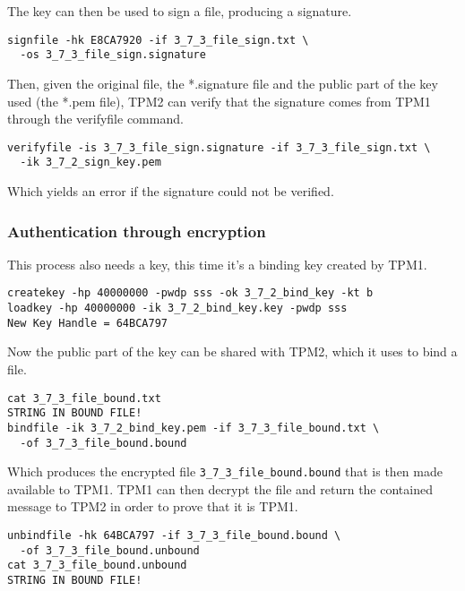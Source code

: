 \documentclass[10pt]{article}
\begin{document}
      The key can then be used to sign a file, producing a signature.

\begin{verbatim}
signfile -hk E8CA7920 -if 3_7_3_file_sign.txt \
  -os 3_7_3_file_sign.signature
\end{verbatim}

      Then, given the original file, the *.signature file and the public part of
      the key used (the *.pem file), TPM2 can verify that the signature comes from
      TPM1 through the verifyfile command.

\begin{verbatim}
verifyfile -is 3_7_3_file_sign.signature -if 3_7_3_file_sign.txt \
  -ik 3_7_2_sign_key.pem
\end{verbatim}

      Which yields an error if the signature could not be verified.

    \subsubsection{Authentication through encryption}

      This process also needs a key, this time it's a binding key created by
      TPM1.

\begin{verbatim}
createkey -hp 40000000 -pwdp sss -ok 3_7_2_bind_key -kt b
loadkey -hp 40000000 -ik 3_7_2_bind_key.key -pwdp sss
New Key Handle = 64BCA797
\end{verbatim}

      Now the public part of the key can be shared with TPM2, which it uses 
      to bind a file.

\begin{verbatim}
cat 3_7_3_file_bound.txt
STRING IN BOUND FILE!
bindfile -ik 3_7_2_bind_key.pem -if 3_7_3_file_bound.txt \
  -of 3_7_3_file_bound.bound
\end{verbatim}

      Which produces the encrypted file \texttt{3\_7\_3\_file\_bound.bound}
      that is then made available to TPM1. TPM1 can then decrypt the file and
      return the contained message to TPM2 in order to prove that it is TPM1.

\begin{verbatim}
unbindfile -hk 64BCA797 -if 3_7_3_file_bound.bound \
  -of 3_7_3_file_bound.unbound
cat 3_7_3_file_bound.unbound
STRING IN BOUND FILE!
\end{verbatim}
\end{document}
